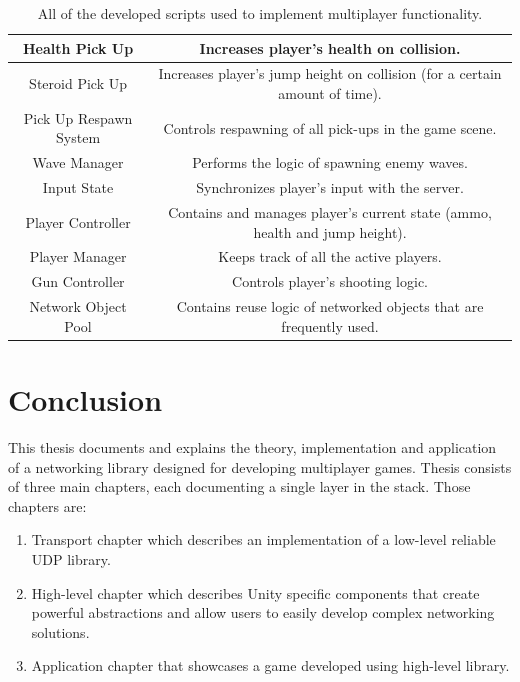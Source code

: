 \documentclass[times, utf8, diplomski]{fer}
\begin{document}
\begin{table}[H]
{\begin{tabular}{|c|c|}
			Health Pick Up          & Increases player's health on collision.                                     \\ \hline
			Steroid Pick Up         & Increases player's jump height on collision (for a certain amount of time). \\ \hline
			Pick Up Respawn System  & Controls respawning of all pick-ups in the game scene.                      \\ \hline
			Wave Manager            & Performs the logic of spawning enemy waves.                                 \\ \hline
			Input State             & Synchronizes player's input with the server.                                \\ \hline
			Player Controller       & Contains and manages player's current state (ammo, health and jump height). \\ \hline
			Player Manager          & Keeps track of all the active players.                                      \\ \hline
			Gun Controller          & Controls player's shooting logic.                                           \\ \hline
			Network Object Pool     & Contains reuse logic of networked objects that are frequently used.         \\ \hline
		\end{tabular}%
	}
	\caption{All of the developed scripts used to implement multiplayer functionality.}
	\label{table:game-scene-network-scripts}
\end{table}



\chapter{Conclusion}
This thesis documents and explains the theory, implementation and application of a networking library designed for developing multiplayer games. Thesis consists of three main chapters, each documenting a single layer in the stack. Those chapters are:

\begin{enumerate}
	\item Transport chapter which describes an implementation of a low-level reliable UDP library.
	\item High-level chapter which describes Unity specific components that create powerful abstractions and allow users to easily develop complex networking solutions.
	\item Application chapter that showcases a game developed using high-level library. 
\end{enumerate}
\end{document}
